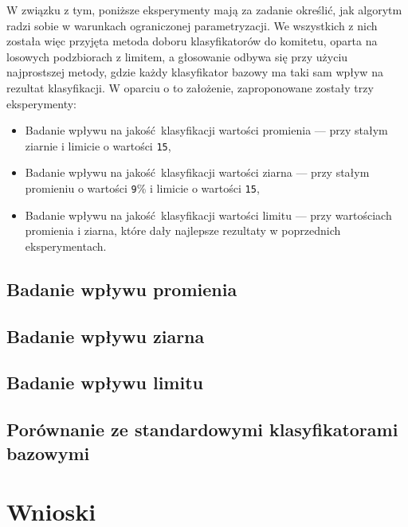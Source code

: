 \documentclass[]{article}
\begin{document}
W związku z tym, poniższe eksperymenty mają za zadanie określić, jak algorytm radzi sobie w warunkach ograniczonej parametryzacji. We wszystkich z nich została więc przyjęta metoda doboru klasyfikatorów do komitetu, oparta na losowych podzbiorach z limitem, a głosowanie odbywa się przy użyciu najprostszej metody, gdzie każdy klasyfikator bazowy ma taki sam wpływ na rezultat klasyfikacji. W oparciu o to założenie, zaproponowane zostały trzy eksperymenty:

\begin{itemize}
	\item Badanie wpływu na jakość klasyfikacji wartości promienia --- przy stałym ziarnie i limicie o wartości \verb|15|,
	\item Badanie wpływu na jakość klasyfikacji wartości ziarna --- przy stałym promieniu o wartości \verb|9|\% i limicie o wartości \verb|15|,
	\item Badanie wpływu na jakość klasyfikacji wartości limitu --- przy wartościach promienia i ziarna, które dały najlepsze rezultaty w poprzednich eksperymentach. 
\end{itemize}

	\subsection{Badanie wpływu promienia}
	
	\subsection{Badanie wpływu ziarna}
	
	\subsection{Badanie wpływu limitu}
	
	\subsection{Porównanie ze standardowymi klasyfikatorami bazowymi}
	

\section{Wnioski}
%



\end{document}
